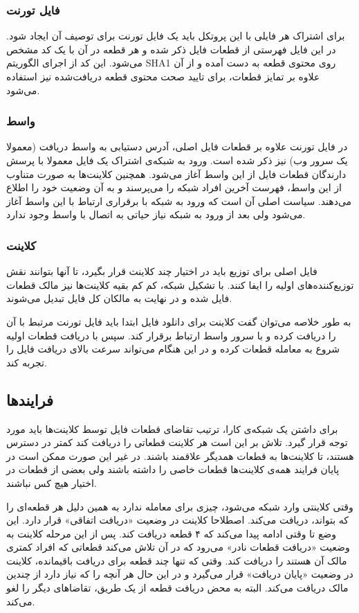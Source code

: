 \documentclass{article}
\begin{document}
\subsubsection{فایل تورنت}
برای اشتراک هر فایلی با این پروتکل باید یک فایل تورنت برای توصیف آن ایجاد شود. در این فایل فهرستی از قطعات فایل ذکر شده و هر قطعه در آن با یک کد مشخص می‌شود. این کد از اجرای الگوریتم SHA1 روی محتوی قطعه به دست آمده و از آن علاوه بر تمایز قطعات، برای تایید صحت محتوی قطعه دریافت‌شده نیز استفاده می‌شود.

\subsubsection{واسط}
در فایل تورنت علاوه بر قطعات فایل اصلی، آدرس دستیابی به واسط دریافت (معمولا یک سرور وب) نیز ذکر شده است. ورود به شبکه‌ی اشتراک یک فایل معمولا با پرسش دارندگان قطعات فایل از این واسط آغاز می‌شود. همچنین کلاینت‌ها به صورت متناوب از این واسط، فهرست آخرین افراد شبکه را می‌پرسند و به آن وضعیت خود را اطلاع می‌دهند. سیاست اصلی آن است که ورود به شبکه با برقراری ارتباط با این واسط آغاز می‌شود ولی بعد از ورود به شبکه نیاز حیاتی به اتصال با واسط وجود ندارد.

\subsubsection{کلاینت}
فایل اصلی برای توزیع باید در اختیار چند کلاینت قرار بگیرد، تا آنها بتوانند نقش توزیع‌کننده‌های اولیه را ایفا کنند. با تشکیل شبکه، کم کم بقیه کلاینت‌ها نیز مالک قطعات فایل شده و در نهایت به مالکان کل فایل تبدیل می‌شوند.

به طور خلاصه می‌توان گفت کلاینت برای دانلود فایل ابتدا باید فایل تورنت مرتبط با آن را دریافت کرده و با سرور واسط ارتباط برقرار کند. سپس با دریافت قطعات اولیه شروع به معامله قطعات کرده و در این هنگام می‌تواند سرعت بالای دریافت فایل را تجربه کند. 

\subsection{فرایندها}
برای داشتن یک شبکه‌ی کارا، ترتیب تقاضای قطعات فایل توسط کلاینت‌ها باید مورد توجه قرار گیرد. تلاش بر این است هر کلاینت قطعاتی را دریافت کند کمتر در دسترس هستند، تا کلاینت‌ها به قطعات همدیگر علاقمند باشند. در غیر این صورت ممکن است در پایان فرایند همه‌ی کلاینت‌ها قطعات خاصی را داشته باشند ولی بعضی از قطعات در اختیار هیچ کس نباشند. 

وقتی کلاینتی وارد شبکه می‌شود، چیزی برای معامله ندارد به همین دلیل هر قطعه‌ای را که بتواند، دریافت می‌کند. اصطلاحا کلاینت در وضعیت «دریافت اتفاقی» قرار دارد. این وضع تا وقتی ادامه پیدا می‌کند که ۴ قطعه دریافت کند. پس از این مرحله کلاینت به وضعیت «دریافت قطعات نادر» می‌رود که در آن تلاش می‌کند قطعاتی که افراد کمتری مالک آن هستند را دریافت کند. وقتی که تنها چند قطعه برای دریافت باقیمانده، کلاینت در وضعیت «پایان دریافت» قرار می‌گیرد و در این حال هر آنچه را که نیاز دارد از چندین مالک دریافت می‌کند. البته به محض دریافت قطعه از یک طریق، تقاضاهای دیگر را لغو می‌کند.
\end{document}
